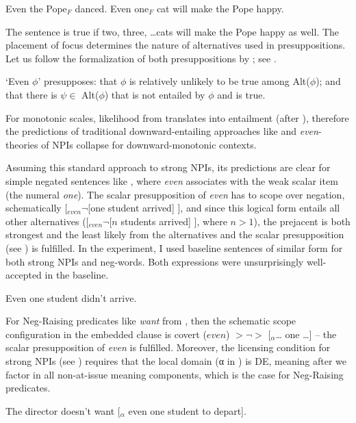\documentclass[output=paper,colorlinks,citecolor=brown]{langscibook}
\begin{document}
\ea\label{ex-10} \ea\label{ex-10-a} Even the Pope$_F$ danced.
\ex\label{ex-10-b} Even one$_F$ cat will make the Pope happy.\z\z

\noindent The sentence is true if two, three, \ldots  cats will make the Pope happy as well. The placement of focus determines the nature of alternatives used in presuppositions. Let us follow the formalization of both presuppositions by \citet{panizza2020minimal}; see . 

\ea\label{ex-11} `Even $\phi$' presupposes:
\ea that $\phi$ is relatively unlikely to be true among Alt($\phi$); and
\ex that there is $\psi \in$ Alt($\phi$) that is not entailed by $\phi$ and is true.\z\z

\noindent For monotonic scales, likelihood from  translates into entailment (after \citealt{crnic2011getting}), therefore the predictions of traditional downward-entailing approaches like \citep{ladusaw1992expressing} and \textit{even}-theories of NPIs collapse for downward-monotonic contexts.

Assuming this standard approach to strong NPIs, its predictions are clear for simple negated sentences like , where \textit{even} associates with the weak scalar item (the numeral \textit{one}). The scalar presupposition of \textit{even} has to scope over negation, schematically [$_{even} \neg$[one student arrived] ], and since this logical form entails all other alternatives ([$_{even} \neg$[$n$ students arrived] ], where $n > 1$), the prejacent is both strongest and the least likely from the alternatives and the scalar presupposition (see ) is fulfilled. In the experiment, I used baseline sentences of similar form for both strong NPIs and neg-words. Both expressions were unsurprisingly well-accepted in the baseline. 

\ea\label{ex-10-neg} Even one student didn't arrive.
\z

\noindent For Neg-Raising predicates like \textit{want} from , then the schematic scope configuration in the embedded clause is covert ($even$) $>
\neg >$
{[$_α$}\ldots{} one \ldots{]} -- the scalar presupposition of \textit{even} is fulfilled. Moreover, the licensing condition for strong NPIs (see ) requires that the local domain (α in ) is DE, meaning after we factor in all non-at-issue meaning components, which is the case for Neg-Raising predicates.

\ea\label{ex-10-nr} The director doesn't want [$_α$ even one student to depart].
\z
\end{document}
